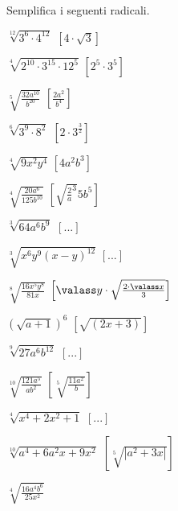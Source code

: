 \begin{esercizio}[\Ast]
 \label{ese:2.27}
Semplifica i seguenti radicali.
 \begin{multicols}{2}
 \begin{enumeratea}
 \item $\sqrt[12]{3^6\cdot 4^{12}}$
  \hfill $\left[4\cdot \sqrt 3\right]$
 \item $\sqrt[4]{2^{10}\cdot 3^{15}\cdot 12^5}$
  \hfill $\left[2^5 \cdot 3^5\right]$
 \item $\sqrt[5]{\frac{32a^{10}}{b^{20}}}$
  \hfill $\left[\frac{2 a^2}{b^4}\right]$
 \item $\sqrt[6]{3^9\cdot 8^2}$
  \hfill $\left[2 \cdot 3^\frac{3}{2}\right]$
 \item $\sqrt[4]{9x^2y^4}$
  \hfill $\left[4a^2b^3\right]$
 \item $\sqrt[4]{\frac{20a^6}{125b^{10}}}$
  \hfill $\left[\sqrt{\frac2 a^3}{5 b^5}\right]$
 \item $\sqrt[3]{64a^6b^9}$
  \hfill $\left[...\right]$
 \item $\sqrt[3]{x^6y^9(x-y)^{12}}$
  \hfill $\left[...\right]$
 \item $\sqrt[8]{\frac{16x^5y^8}{81x}}$
  \hfill $\left[\valass y \cdot \sqrt{\frac{2\cdot \valass x} 3}\right]$
 \item $\left(\sqrt{a+1}\right)^6$
  \hfill $\left[\sqrt{(2x+3)}\right]$
 \item $\sqrt[9]{27a^6b^{12}}$
  \hfill $\left[...\right]$
 \item $\sqrt[10]{\frac{121a^5}{ab^2}}$
  \hfill $\left[\sqrt[5]{\frac{11a^2}{b}}\right]$
 \item $\sqrt[4]{x^4+2x^2+1}$
  \hfill $\left[...\right]$
 \item $\sqrt[10]{a^4+6a^2x+9x^2}$
  \hfill $\left[\sqrt[5]{\left|a^2+3x\right|}\right]$
 \item $\sqrt[4]{\frac{16a^4b^6}{25x^2}}$

\end{enumeratea}
\end{multicols}
\end{esercizio}
